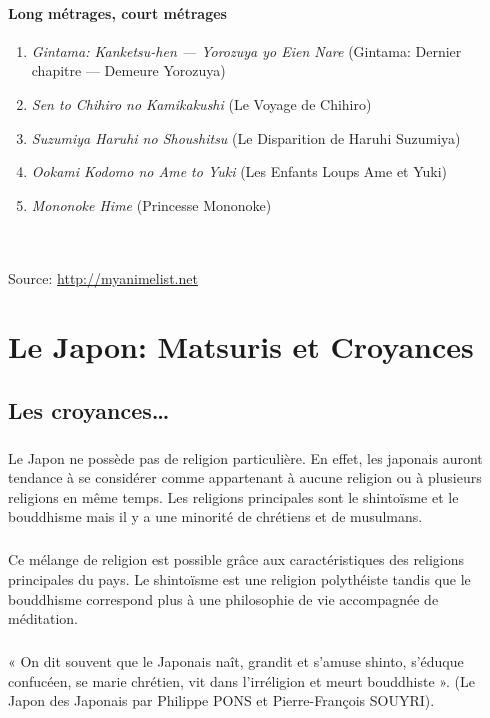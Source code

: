 \subsubsection{Long métrages, court métrages}

\begin{enumerate}
	\item \emph{Gintama: Kanketsu-hen --- Yorozuya yo Eien Nare} (Gintama: Dernier chapitre --- Demeure Yorozuya)
	\item \emph{Sen to Chihiro no Kamikakushi} (Le Voyage de Chihiro)
	\item \emph{Suzumiya Haruhi no Shoushitsu} (Le Disparition de Haruhi Suzumiya)
	\item \emph{Ookami Kodomo no Ame to Yuki} (Les Enfants Loups Ame et Yuki)
	\item \emph{Mononoke Hime} (Princesse Mononoke)
\end{enumerate}
~\\~\\
\noindent
Source: \url{http://myanimelist.net}

\chapter[Matsuris et Croyances]{Le Japon: Matsuris et Croyances}

\section{Les croyances\ldots}

\paragraph{} Le Japon ne possède pas de religion particulière. En effet, les
japonais auront tendance à se considérer comme appartenant à aucune religion ou
à plusieurs religions en même temps. Les religions principales sont le
shintoïsme et le bouddhisme mais il y a une minorité de chrétiens et de
musulmans.

\paragraph{} Ce mélange de religion est possible grâce aux caractéristiques des
religions principales du pays. Le shintoïsme est une religion polythéiste
tandis que le bouddhisme correspond plus à une philosophie de vie accompagnée
de méditation.

\paragraph{} « On dit souvent que le Japonais naît, grandit et s’amuse shinto,
s’éduque confucéen, se marie chrétien, vit dans l’irréligion et meurt
bouddhiste ». (Le Japon des Japonais par Philippe PONS et Pierre-François
SOUYRI).

